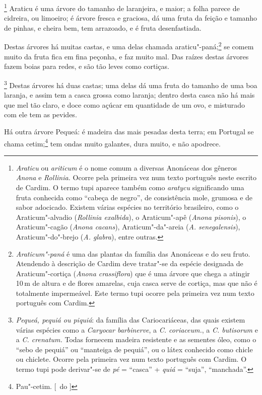 \footnote{ \textit{Araticu} ou \textit{ariticum} é o
nome comum a diversas Anonáceas dos gêneros \textit{Anona} e 
\textit{Rollinia.} Ocorre pela primeira vez num texto português neste
escrito de Cardim. O termo tupi aparece também como \textit{aratycu}
significando uma fruta conhecida como ``cabeça de negro'', de
consistência mole, grumosa e de sabor adocicado. Existem várias
espécies no território brasileiro, como o Araticum"-alvadio
(\textit{Rollinia exalbida}), o Araticum"-apê (\textit{Anona pisonis}), 
o Araticum"-cagão (\textit{Anona cacans}), Araticum"-da"-areia
(\textit{A. senegalensis}), Araticum"-do"-brejo (\textit{A. glabra}), 
entre outras.} Araticu é uma árvore do tamanho de
laranjeira, e maior; a folha parece de cidreira, ou limoeiro; é árvore
fresca e graciosa, dá uma fruta da feição e tamanho de pinhas, e cheira
bem, tem arrazoado, e é fruta desenfastiada.

 Destas árvores há muitas castas, e uma delas chamada 
araticu"-paná;\footnote{ \textit{Araticum"-paná} é uma das plantas da família das
Anonáceas e do seu fruto. Atendendo à descrição de Cardim deve
tratar"-se da espécie designada de Araticum"-cortiça (\textit{Anona
crassiflora}) que é uma árvore que chega a atingir 10\,m de altura e de
flores amarelas, cuja casca serve de cortiça, mas que não é totalmente
impermeável. Este termo tupi ocorre pela primeira vez num texto
português com Cardim.} se comem muito da fruta fica em fina peçonha, e
faz muito mal. Das raízes destas árvores fazem boias para redes, e são
tão leves como cortiças.

\footnote{ \textit{Pequeá, pequiá ou piquiá}: da
família das Cariocariáceas, das quais existem várias espécies como a 
\textit{Caryocar barbinerve}, a \textit{C. coriaceum.}, a \textit{C.
butisorum} e a \textit{C. crenatum.} Todas fornecem madeira resistente
e as sementes óleo, como o ``sebo de pequiá'' ou ``manteiga de pequiá'', ou
o látex conhecido como chicle ou chiclete. Ocorre pela primeira vez num
texto português com Cardim. O termo tupi pode derivar"-se de \textit{pé} = 
``casca'' + \textit{quiá} = ``suja'', ``manchada''.} Destas
árvores há duas castas; uma delas dá uma fruta do tamanho de uma boa
laranja, e assim tem a casca grossa como laranja; dentro desta casca
não há mais que mel tão claro, e doce como açúcar em quantidade de um
ovo, e misturado com ele tem as pevides.

 Há outra árvore Pequeá: é madeira das mais pesadas desta terra; em
Portugal se chama cetim;\footnote{ Pau"-cetim. [~do ]} tem ondas muito galantes, dura muito, e não
apodrece.

